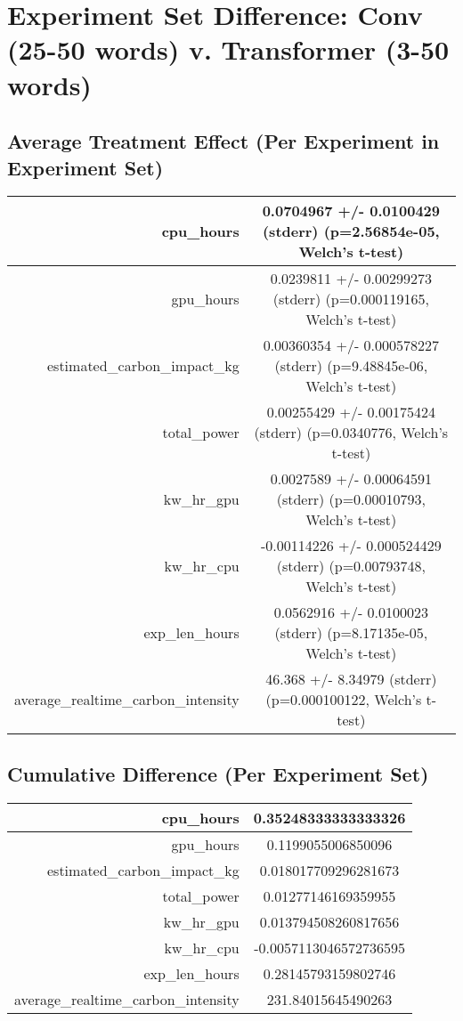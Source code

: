 \documentclass{article}%
\begin{document}
%
\normalsize%
\section{Experiment Set Difference: Conv (25{-}50 words) v. Transformer (3{-}50 words)}%
\label{sec:Experiment Set Difference Conv (25{-}50 words) v. Transformer (3{-}50 words)}%
\subsection{Average Treatment Effect (Per Experiment in Experiment Set)}%
\label{subsec:Average Treatment Effect (Per Experiment in Experiment Set)}%
\begin{tabular}{|r|c|}%
\hline%
cpu\_hours&0.0704967 +/{-} 0.0100429 (stderr) (p=2.56854e{-}05, Welch's t{-}test)\\%
\hline%
gpu\_hours&0.0239811 +/{-} 0.00299273 (stderr) (p=0.000119165, Welch's t{-}test)\\%
\hline%
estimated\_carbon\_impact\_kg&0.00360354 +/{-} 0.000578227 (stderr) (p=9.48845e{-}06, Welch's t{-}test)\\%
\hline%
total\_power&0.00255429 +/{-} 0.00175424 (stderr) (p=0.0340776, Welch's t{-}test)\\%
\hline%
kw\_hr\_gpu&0.0027589 +/{-} 0.00064591 (stderr) (p=0.00010793, Welch's t{-}test)\\%
\hline%
kw\_hr\_cpu&{-}0.00114226 +/{-} 0.000524429 (stderr) (p=0.00793748, Welch's t{-}test)\\%
\hline%
exp\_len\_hours&0.0562916 +/{-} 0.0100023 (stderr) (p=8.17135e{-}05, Welch's t{-}test)\\%
\hline%
average\_realtime\_carbon\_intensity&46.368 +/{-} 8.34979 (stderr) (p=0.000100122, Welch's t{-}test)\\%
\hline%
\end{tabular}

%
\subsection{Cumulative Difference (Per Experiment Set)}%
\label{subsec:Cumulative Difference (Per Experiment Set)}%
\begin{tabular}{|r|c|}%
\hline%
cpu\_hours&0.35248333333333326\\%
\hline%
gpu\_hours&0.1199055006850096\\%
\hline%
estimated\_carbon\_impact\_kg&0.018017709296281673\\%
\hline%
total\_power&0.01277146169359955\\%
\hline%
kw\_hr\_gpu&0.013794508260817656\\%
\hline%
kw\_hr\_cpu&{-}0.0057113046572736595\\%
\hline%
exp\_len\_hours&0.28145793159802746\\%
\hline%
average\_realtime\_carbon\_intensity&231.84015645490263\\%
\hline%
\end{tabular}

%
\end{document}
